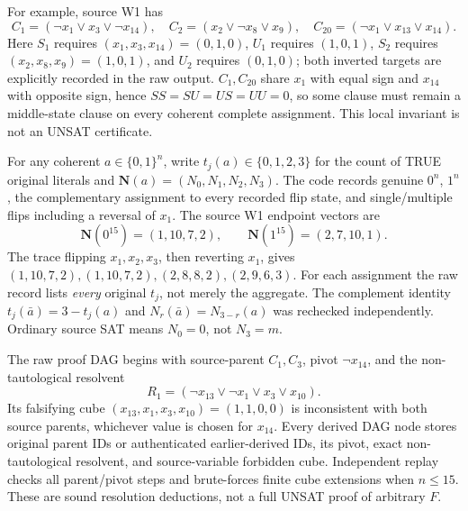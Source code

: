 \documentclass[11pt]{article}
\newcommand{\vN}{\boldsymbol{N}}
\begin{document}
For example, source W1 has
\[
 C_1=(\neg x_1\lor x_3\lor\neg x_{14}),\quad C_2=(x_2\lor\neg x_8\lor x_9),\quad C_{20}=(\neg x_1\lor x_{13}\lor x_{14}).
\]
Here $S_1$ requires $(x_1,x_3,x_{14})=(0,1,0)$, $U_1$ requires $(1,0,1)$, $S_2$ requires $(x_2,x_8,x_9)=(1,0,1)$, and $U_2$ requires $(0,1,0)$; both inverted targets are explicitly recorded in the raw output. $C_1,C_{20}$ share $x_1$ with equal sign and $x_{14}$ with opposite sign, hence $SS=SU=US=UU=0$, so some clause must remain a middle-state clause on every coherent complete assignment. This local invariant is not an UNSAT certificate.

For any coherent $a\in\{0,1\}^n$, write $t_j(a)\in\{0,1,2,3\}$ for the count of TRUE original literals and $\vN(a)=(N_0,N_1,N_2,N_3)$. The code records genuine $0^n$, $1^n$, the complementary assignment to every recorded flip state, and single/multiple flips including a reversal of $x_1$. The source W1 endpoint vectors are
\[
 \vN(0^{15})=(1,10,7,2),\qquad \vN(1^{15})=(2,7,10,1).
\]
The trace flipping $x_1,x_2,x_3$, then reverting $x_1$, gives $(1,10,7,2),(1,10,7,2),(2,8,8,2),(2,9,6,3)$. For each assignment the raw record lists \emph{every} original $t_j$, not merely the aggregate. The complement identity $t_j(\bar a)=3-t_j(a)$ and $N_r(\bar a)=N_{3-r}(a)$ was rechecked independently. Ordinary source SAT means $N_0=0$, not $N_3=m$.

The raw proof DAG begins with source-parent $C_1,C_3$, pivot $\neg x_{14}$, and the non-tautological resolvent
\[ R_1=(\neg x_{13}\lor\neg x_1\lor x_3\lor x_{10}).\]
Its falsifying cube $(x_{13},x_1,x_3,x_{10})=(1,1,0,0)$ is inconsistent with both source parents, whichever value is chosen for $x_{14}$. Every derived DAG node stores original parent IDs or authenticated earlier-derived IDs, its pivot, exact non-tautological resolvent, and source-variable forbidden cube. Independent replay checks all parent/pivot steps and brute-forces finite cube extensions when $n\le15$. These are sound resolution deductions, not a full UNSAT proof of arbitrary $F$.
\end{document}
